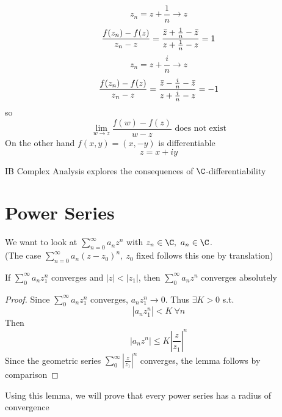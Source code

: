 \begin{example}
\begin{tikzpicture}[x=0.75pt,y=0.75pt,yscale=-1,xscale=1]
\end{tikzpicture}\\
\[z_n = z+ \frac{1}{n}\to z\]
\[\frac{f(z_n)-f(z)}{z_n-z} = \frac{\Bar{z} + \frac{1}{n} - \Bar{z}}{z+\frac{1}{n}-z} = 1\]
\[z_n = z + \frac{i}{n}\to z\]
\[\frac{f(z_n)-f(z)}{z_n-z} =\frac{\Bar{z} - \frac{i}{n} - \Bar{z}}{z+\frac{i}{n}-z} = -1\]
so
\[\lim_{w\to z}\frac{f(w) - f(z)}{w-z}\text{ does not exist}\]
On the other hand $f(x,y) = (x,-y)$ is differentiable
\[z = x + iy\]
\begin{note}
IB Complex Analysis explores the consequences of $\C$-differentiability
\end{note}
\end{example}
\section{Power Series}
\begin{normal}
We want to look at $\sum_{n=0}^\infty a_nz^n$ with $z_n\in \C, \ a_n\in\C$.\\
(The case $\sum_{n=0}^\infty a_n(z-z_0)^n, \ z_0$ fixed follows this one by translation)
\end{normal}
\begin{lemma}
If $\sum_0^\infty a_nz_1^n$ converges and $|z|<|z_1|$, then $\sum_0^\infty a_nz^n$ converges absolutely
\begin{proof}
Since $\sum_0^\infty a_n z_1^n$ converges, $a_nz_1^n\to 0$. Thus $\exists K>0$ s.t. \[|a_nz_1^n|<K \ \forall n\]
Then
\[|a_nz^n|\leq K\left|\frac{z}{z_1}\right|^n\]
Since the geometric series $\sum_0^\infty\left|\frac{z}{z_1}\right|^n$ converges, the lemma follows by comparison
\end{proof}
\end{lemma}
\begin{normal}
Using this lemma, we will prove that every power series has a radius of convergence
\end{normal}

